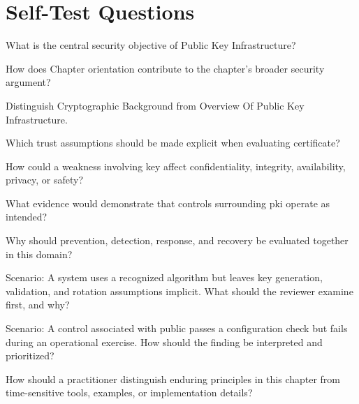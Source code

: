 \documentclass[11pt,letterpaper]{article}
\begin{document}
\section*{Self-Test Questions}
\begin{CornellRecallList}
\item What is the central security objective of Public Key Infrastructure?
\item How does Chapter orientation contribute to the chapter's broader security argument?
\item Distinguish Cryptographic Background from Overview Of Public Key Infrastructure.
\item Which trust assumptions should be made explicit when evaluating certificate?
\item How could a weakness involving key affect confidentiality, integrity, availability, privacy, or safety?
\item What evidence would demonstrate that controls surrounding pki operate as intended?
\item Why should prevention, detection, response, and recovery be evaluated together in this domain?
\item Scenario: A system uses a recognized algorithm but leaves key generation, validation, and rotation assumptions implicit. What should the reviewer examine first, and why?
\item Scenario: A control associated with public passes a configuration check but fails during an operational exercise. How should the finding be interpreted and prioritized?
\item How should a practitioner distinguish enduring principles in this chapter from time-sensitive tools, examples, or implementation details?
\end{CornellRecallList}
\end{document}
